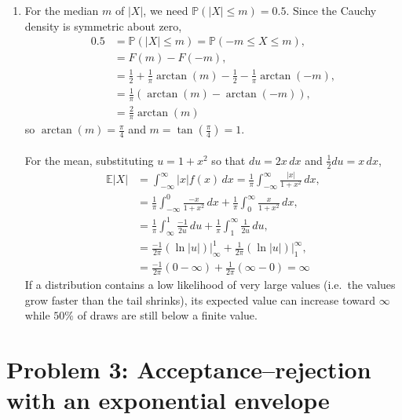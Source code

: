 \documentclass[11pt]{article}
\begin{document}
\begin{enumerate}[label=(\alph*)]
    \item
    For the median $m$ of $|X|$, we need $\mathbb{P}(|X| \le m) = 0.5$. Since the Cauchy density is
    symmetric about zero,
    \begin{align*}
        0.5 &= \mathbb{P}(|X| \le m) = \mathbb{P}(-m \le X \le m), \\
            &= F(m) - F(-m), \\
            &= \frac{1}{2} + \frac{1}{\pi}\arctan(m) - \frac{1}{2} - \frac{1}{\pi}\arctan(-m), \\
            &= \frac{1}{\pi}\left(\arctan(m) - \arctan(-m)\right), \\
            &= \frac{2}{\pi}\arctan(m)
    \end{align*}
    so $\arctan(m) = \frac{\pi}{4}$ and $m = \tan\!\left(\frac{\pi}{4}\right) = 1$. \\ \\
    For the mean, substituting $u = 1 + x^2$ so that $du = 2x \, dx$ and $\frac{1}{2} du = x \, dx$,
    \begin{align*}
        \mathbb{E}|X| &= \int_{-\infty}^{\infty} |x| f(x) \, dx
                       = \frac{1}{\pi}\int_{-\infty}^{\infty} \frac{|x|}{1+x^2} \, dx, \\
                      &= \frac{1}{\pi}\int_{-\infty}^{0} \frac{-x}{1+x^2} \, dx
                       + \frac{1}{\pi}\int_{0}^{\infty} \frac{x}{1+x^2} \, dx, \\
                      &= \frac{1}{\pi}\int_{\infty}^{1} \frac{-1}{2u} \, du
                       + \frac{1}{\pi}\int_{1}^{\infty} \frac{1}{2u} \, du, \\
                      &= \frac{-1}{2\pi}\left(\ln|u|\right)\Big|_{\infty}^{1}
                       + \frac{1}{2\pi}\left(\ln|u|\right)\Big|_{1}^{\infty}, \\
                      &= \frac{-1}{2\pi}\left(0 - \infty\right) + \frac{1}{2\pi}\left(\infty - 0\right)
                       = \infty
    \end{align*}
    If a distribution contains a low likelihood of very large values (i.e.\ the values grow faster
    than the tail shrinks), its expected value can increase toward $\infty$ while $50\%$ of draws are
    still below a finite value.
\end{enumerate}

\section*{Problem 3: Acceptance--rejection with an exponential envelope}
\end{document}
